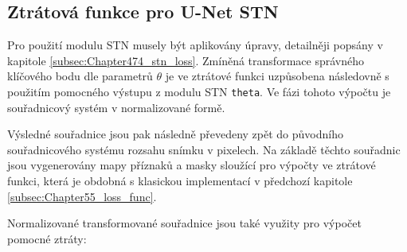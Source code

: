\subsection{Ztrátová funkce pro U-Net STN}
\label{subsec:Chapter55_loss_func_stn}

Pro použití modulu STN musely být aplikovány úpravy, detailněji popsány v kapitole \ref{subsec:Chapter474_stn_loss}. Zmíněná transformace správného klíčového bodu dle parametrů $\theta$ je ve ztrátové funkci uzpůsobena následovně s použitím pomocného výstupu z modulu STN \texttt{theta}. Ve fázi tohoto výpočtu je souřadnicový systém v normalizované formě.

\label{src:loss_func_stn_inv_pos}


Výsledné souřadnice jsou pak následně převedeny zpět do původního souřadnicového systému rozsahu snímku v pixelech. Na základě těchto souřadnic jsou vygenerovány mapy příznaků a masky sloužící pro výpočty ve ztrátové funkci, která je obdobná s klasickou implementací v předchozí kapitole \ref{subsec:Chapter55_loss_func}.

Normalizované transformované souřadnice jsou také využity pro výpočet pomocné ztráty:
\label{src:loss_stn_aux_func}


\endinput